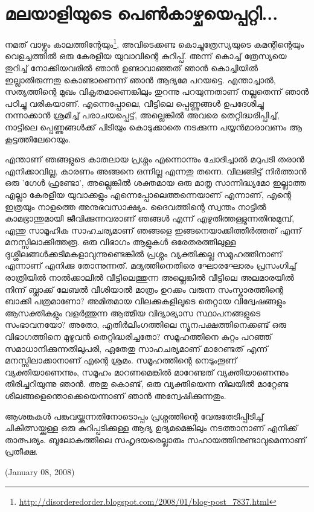 \section*{മലയാളിയുടെ പെണ്‍കാഴ്ചയെപ്പറ്റി...}
\vskip 2pt

നമത് വാഴ്വും കാലത്തിന്റേയും\footnote{\url{http://disorderedorder.blogspot.com/2008/01/blog-post_7837.html}}, 
അവിടെക്കണ്ട കൊച്ചുത്രേസ്യയുടെ കമന്റിന്റെയും വെളച്ചത്തില്‍ ഒരു കേരളീയ യുവാവിന്റെ കുറിപ്പ്. 
അന്ന് കൊച്ച് ത്രേസ്യയെ തുറിച്ച് നോക്കിയവരില്‍ ഞാന്‍ ഉണ്ടാവാഞ്ഞത് ഞാന്‍ കൊച്ചിയില്‍ ഇല്ലാതിരുന്നതു 
കൊണ്ടാണെന്ന് ഞാന്‍ ആദ്യമേ പറയട്ടെ. എന്താച്ചാല്‍, സത്യത്തിന്റെ മുഖം വികൃതമാണെങ്കിലും 
തുറന്നു പറയുന്നതാണ് നല്ലതെന്ന് ഞാന്‍ പഠിച്ചു വരികയാണ്. എന്നെപ്പോലെ, വീട്ടിലെ പ്പെണ്ണുങ്ങള്‍ ഉപദേശിച്ചു 
നന്നാക്കാന്‍ ശ്രമിച്ച് പരാചയപ്പെട്ട്, അല്ലെങ്കില്‍ അവരെ തെറ്റിദ്ധരിപ്പിച്ച്, നാട്ടിലെ പ്പെണ്ണുങ്ങള്‍ക്ക് പിടിയും കൊടുക്കാതെ 
നടക്കുന്ന പയ്യന്‍മാരാവണം ആ കൂട്ടത്തിലേറെയും.

എന്താണ് ഞങ്ങളുടെ കാതലായ പ്രശ്നം എന്നൊന്നും ചോദിച്ചാല്‍ മറുപടി തരാന്‍ എനിക്കാവില്ല, കാരണം അങ്ങനെ ഒന്നില്ല 
എന്നതു തന്നെ. വിലങ്ങിട്ട് നിര്‍ത്താന്‍ ഒരു 'ഗേള്‍ ഫ്രണ്ടോ', അല്ലെങ്കില്‍ ശക്തമായ ഒരു മാതൃ സാന്നിദ്ധ്യമോ ഇല്ലാത്ത എല്ലാ 
കേരളീയ യുവാക്കളും എന്നെപ്പോലെത്തന്നെയാണ് എന്നാണ്, എന്റെ ഇത്രയും നാളത്തെ അനുഭവസാക്ഷ്യം. ദൈവത്തിന്റെ 
സ്വന്തം നാട്ടില്‍ കാമഭ്രാന്തുമായി ജീവിക്കുന്നവരാണ് ഞങ്ങള്‍ എന്ന് എഴുതിത്തള്ളുന്നതിനുമുമ്പ്, എന്തു സാമൂഹിക സാഹചര്യമാണ് 
ഞങ്ങളെ ഇങ്ങനെയാക്കിത്തീര്‍ത്തത് എന്ന് മനസ്സിലാക്കിത്തരൂ. ഒരു വിഭാഗം ആളുകള്‍ ഒരേതരത്തിലുള്ള 
ദുശ്ശീലങ്ങള്‍ക്കടിമകളാവുന്നുണ്ടെങ്കില്‍ പ്രശ്നം വ്യക്തിക്കല്ല സമൂഹത്തിനാണ് എന്നാണ് എനിക്കു തോന്നുന്നത്. 
മദ്യത്തിനെതിരെ ഘോരഘോരം പ്രസംഗിച്ച് രാത്രിയില്‍ നാല്‍ക്കാലില്‍ വീട്ടിലെത്തുന്ന അല്ലെങ്കില്‍ വീട്ടിലെ അലമാരയില്‍ 
നിന്ന് ബ്ലാക്ക് ലേബല്‍ വീശിയാല്‍ മാത്രം ഉറക്കം വരുന്ന സംസ്കാരത്തിന്റെ ബാക്കി പത്രമാണോ? അമിതമായ 
വിലക്കുകളിലൂടെ തെറ്റായ വിദ്വേഷങ്ങളും ആസക്തികളും വളര്‍ത്തുന്ന ആത്മീയ വിദ്യാഭ്യാസ സ്ഥാപനങ്ങളുടെ 
സംഭാവനയോ? അതോ, എതിര്‍ലിംഗത്തിലെ ന്യൂനപക്ഷത്തിനെക്കണ്ട് ഒരു വിഭാഗത്തിനെ മുഴുവന്‍ തെറ്റിദ്ധരിച്ചതോ? 
സമൂഹത്തിനെ കുറ്റം പറഞ്ഞ് സമാധാനിക്കുന്നതിലുപരി, ഏതേതു സാഹചര്യമാണ് മാറേണ്ടത് എന്ന് മനസ്സിലാക്കാനാണ് 
എന്റെ ശ്രമം. സമൂഹത്തിന്റെ നെടുംതൂണ് വ്യക്തിയാണെന്നും, സമൂഹം മാറണമെങ്കില്‍ മാറേണ്ടത് 
വ്യക്തിയാണെന്നും തിരിച്ചറിയുന്നു ഞാന്‍. അതു കൊണ്ട്, ഒരു വ്യക്തിയെന്ന നിലയില്‍ മാറ്റേണ്ട 
ശീലങ്ങളെന്തൊക്കെയെന്നാണ് ഞാന്‍ അന്വേഷിക്കുന്നതും.

ആശങ്കകള്‍ പങ്കുവയ്ക്കുന്നതിനോടൊപ്പം പ്രശ്നത്തിന്റെ വേരുതേടിപ്പിടിച്ച് ചികിത്സയ്ക്കുള്ള ഒരു കുറിപ്പടിക്കുള്ള ആദ്യ 
ഉദ്യമമെങ്കിലും നടത്താനാണ് എനിക്ക് താത്പര്യം. ബൂലോകത്തിലെ സഹൃദയരെല്ലാരും സഹായത്തിനുണ്ടാവുമെന്നാണ് പ്രതീക്ഷ.

(January 08, 2008)
\newpage
